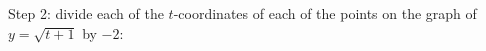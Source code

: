 \documentclass{ximera}
\begin{document}
\begin{example}
\begin{enumerate}
 
 
 Step 2:   divide each of the $t$-coordinates of each of the points on the graph of $y = \sqrt{t+1}$ by $-2$:
 











\end{enumerate}
\end{example}
\end{document}
